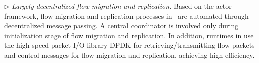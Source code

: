 

$\triangleright$ {\em Largely decentralized flow migration and replication.} Based on the actor framework, flow migration and replication processes in \nfactor~are automated through decentralized message passing. A central coordinator is involved only during initialization stage of flow migration and replication. %
 In addition, runtimes in \nfactor use the high-speed packet I/O library DPDK \cite{dpdk} for retrieving/transmitting flow packets and control messages for flow migration and replication, achieving high efficiency.


